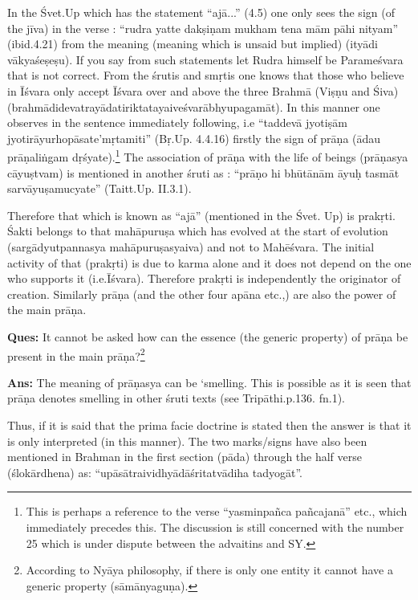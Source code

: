 In the Śvet.Up which has the statement “ajā...” (4.5) one only sees the sign (of the jīva) in the verse : “rudra yatte dakṣiṇam mukham tena mām pāhi nityam” (ibid.4.21) from the meaning (meaning which is unsaid but implied) (ityādi vākyaśeṣeṣu). If you say from such statements let Rudra himself be Parameśvara that is not correct. From the śrutis and smṛtis one knows that those who believe in Īśvara only accept Īśvara over and above the three Brahmā (Viṣṇu and Śiva) (brahmādidevatrayādatiriktatayaiveśvarābhyupagamāt). In this manner one observes in the sentence immediately following, i.e “taddevā jyotiṣām jyotirāyurhopāsate’mṛtamiti” (Bṛ.Up. 4.4.16) firstly the sign of prāṇa (ādau prāṇaliṅgam dṛśyate).\footnote{This is perhaps a reference to the verse “yasminpañca pañcajanā” etc., which immediately precedes this. The discussion is still concerned with the number 25 which is under dispute between the  advaitins and SY.} The association of prāṇa with the life of beings (prāṇasya cāyuṣtvam) is mentioned in another śruti as : “prāṇo hi bhūtānām āyuḥ tasmāt sarvāyuṣamucyate” (Taitt.Up. II.3.1).
 
Therefore that which is known as “ajā” (mentioned in the Śvet. Up) is prakṛti. Śakti belongs to that mahāpuruṣa which has evolved at the start of evolution (sargādyutpannasya mahāpuruṣasyaiva) and not to Mahēśvara. The initial activity of that (prakṛti) is due to karma alone and it does not depend on the one who supports it (i.e.Īśvara). Therefore prakṛti is independently the originator of creation. Similarly prāṇa (and the other four apāna etc.,) are also the power of the main prāṇa.

\textbf{Ques:} It cannot be asked how can the essence (the generic property) of prāṇa be present in the main prāṇa?\footnote{According to Nyāya philosophy, if there is only one entity it cannot have a generic property (sāmānyaguṇa).}

\textbf{Ans:} The meaning of prāṇasya can be ‘smelling. This is possible as it is seen that prāṇa denotes smelling in other śruti texts (see Tripāthi.p.136. fn.1).

Thus, if it is said that the prima facie doctrine is stated then the answer is that it is only interpreted (in this manner). The two marks/signs have also been mentioned in Brahman in the first section (pāda) through the half verse (ślokārdhena) as: “upāsātraividhyādāśritatvādiha tadyogāt”.


